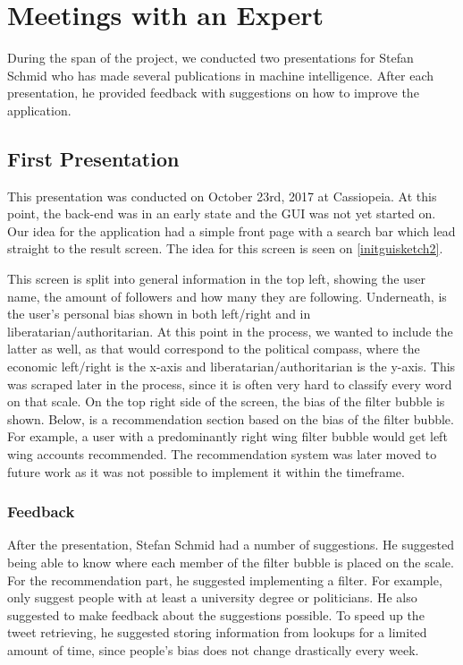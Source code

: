 \section{Meetings with an Expert} \label{expMeeting}
During the span of the project, we conducted two presentations for Stefan
Schmid who has made several publications in machine intelligence. After
each presentation, he provided feedback with suggestions on how to improve
the application.
 
\subsection{First Presentation}\label{subsec:Exp1}
This presentation was conducted on October 23rd, 2017 at Cassiopeia. At
this point, the back-end was in an early state and the \ac{GUI} was not yet
started on. Our idea for the application had a simple front page with a search
bar which lead straight to the result screen. The idea for this screen is seen on
\autoref{initguisketch2}.\nl


This screen is split into general information in the top left, showing the user
name, the amount of followers and how many they are following. Underneath, is
the user's personal bias shown in both left/right and in
liberatarian/authoritarian. At this point in the process, we wanted to include
the latter as well, as that would correspond to the political compass, where the
economic left/right is the x-axis and liberatarian/authoritarian is the y-axis.
This was scraped later in the process, since it is often very hard to classify
every word on that scale. On the top right side of the screen, the bias of the
filter bubble is shown. Below, is a recommendation section based on the bias of
the filter bubble. For example, a user with a predominantly right wing
filter bubble would get left wing accounts recommended. The recommendation
system was later moved to future work as it was not possible to implement it within
the timeframe. 

\subsubsection{Feedback}
After the presentation, Stefan Schmid had a number of suggestions. He suggested
being able to know where each member of the filter bubble is placed on the
scale. For the recommendation part, he suggested implementing a filter. For
example, only suggest people with at least a university degree or politicians. 
He also suggested to make feedback about the suggestions possible.
To speed up the tweet retrieving, he suggested storing information from lookups
for a limited amount of time, since people's bias does not change drastically
every week. 

